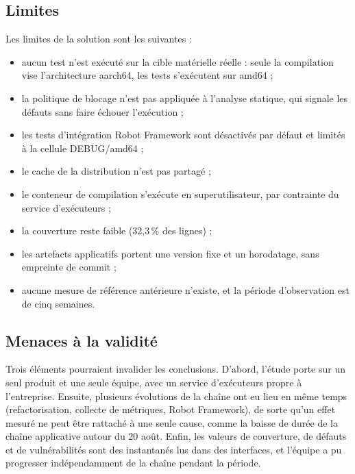 \subsection{Limites}

Les limites de la solution sont les suivantes :
\begin{itemize}[nosep]
  \item aucun test n'est exécuté sur la cible matérielle réelle : seule la
        compilation vise l'architecture aarch64, les tests s'exécutent sur amd64 ;
  \item la politique de blocage n'est pas appliquée à l'analyse statique, qui
        signale les défauts sans faire échouer l'exécution ;
  \item les tests d'intégration Robot Framework sont désactivés par défaut et
        limités à la cellule DEBUG/amd64 ;
  \item le cache de la distribution n'est pas partagé ;
  \item le conteneur de compilation s'exécute en superutilisateur, par
        contrainte du service d'exécuteurs ;
  \item la couverture reste faible (32,3\,\% des lignes) ;
  \item les artefacts applicatifs portent une version fixe et un horodatage,
        sans empreinte de commit ;
  \item aucune mesure de référence antérieure n'existe, et la période
        d'observation est de cinq semaines.
\end{itemize}

\subsection{Menaces à la validité}

Trois éléments pourraient invalider les conclusions. D'abord, l'étude porte sur
un seul produit et une seule équipe, avec un service d'exécuteurs propre à
l'entreprise. Ensuite, plusieurs évolutions de la chaîne ont eu lieu en même
temps (refactorisation, collecte de métriques, Robot Framework), de sorte
qu'un effet mesuré ne peut être rattaché à une seule cause, comme la baisse de
durée de la chaîne applicative autour du 20 août. Enfin, les valeurs de
couverture, de défauts et de vulnérabilités sont des instantanés lus dans des
interfaces, et l'équipe a pu progresser indépendamment de la chaîne pendant la
période.
